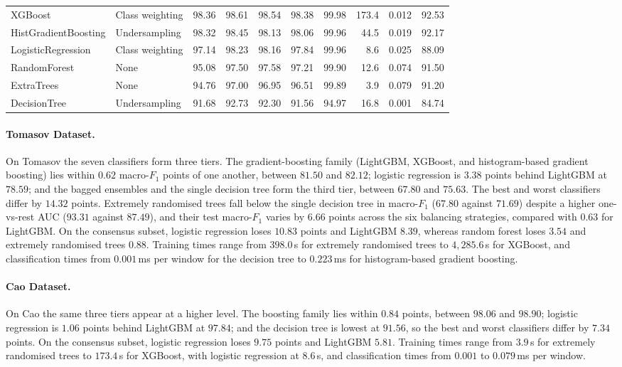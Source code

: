 \begin{table}[!htbp]
{\begin{tabular}{@{}llrrrrrrrr@{}}
		XGBoost              & Class weighting  & 98.36 & 98.61 & 98.54 & 98.38 & 99.98 & 173.4     & 0.012  & 92.53\\
		HistGradientBoosting & Undersampling    & 98.32 & 98.45 & 98.13 & 98.06 & 99.96 & 44.5      & 0.019  & 92.17\\
		LogisticRegression   & Class weighting  & 97.14 & 98.23 & 98.16 & 97.84 & 99.96 & 8.6       & 0.025  & 88.09\\
		RandomForest         & None             & 95.08 & 97.50 & 97.58 & 97.21 & 99.90 & 12.6      & 0.074  & 91.50\\
		ExtraTrees           & None             & 94.76 & 97.00 & 96.95 & 96.51 & 99.89 & 3.9       & 0.079  & 91.20\\
		DecisionTree         & Undersampling    & 91.68 & 92.73 & 92.30 & 91.56 & 94.97 & 16.8      & 0.001  & 84.74\\
		\bottomrule
	\end{tabular}}
\end{table}

\paragraph[Tomasov Dataset]{Tomasov Dataset.}
On Tomasov the seven classifiers form three tiers. The gradient-boosting family (LightGBM, XGBoost, and histogram-based gradient boosting) lies within $0.62$ macro-$F_1$ points of one another, between $81.50$ and $82.12$; logistic regression is $3.38$ points behind LightGBM at $78.59$; and the bagged ensembles and the single decision tree form the third tier, between $67.80$ and $75.63$. The best and worst classifiers differ by $14.32$ points. Extremely randomised trees fall below the single decision tree in macro-$F_1$ ($67.80$ against $71.69$) despite a higher one-vs-rest AUC ($93.31$ against $87.49$), and their test macro-$F_1$ varies by $6.66$ points across the six balancing strategies, compared with $0.63$ for LightGBM. On the consensus subset, logistic regression loses $10.83$ points and LightGBM $8.39$, whereas random forest loses $3.54$ and extremely randomised trees $0.88$. Training times range from $398.0$\,s for extremely randomised trees to $4{,}285.6$\,s for XGBoost, and classification times from $0.001$\,ms per window for the decision tree to $0.223$\,ms for histogram-based gradient boosting.

\paragraph[Cao Dataset]{Cao Dataset.}
On Cao the same three tiers appear at a higher level. The boosting family lies within $0.84$ points, between $98.06$ and $98.90$; logistic regression is $1.06$ points behind LightGBM at $97.84$; and the decision tree is lowest at $91.56$, so the best and worst classifiers differ by $7.34$ points. On the consensus subset, logistic regression loses $9.75$ points and LightGBM $5.81$. Training times range from $3.9$\,s for extremely randomised trees to $173.4$\,s for XGBoost, with logistic regression at $8.6$\,s, and classification times from $0.001$ to $0.079$\,ms per window.

